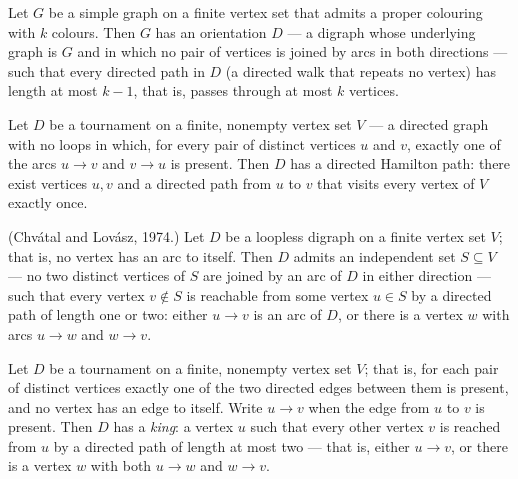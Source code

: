 \begin{theorem}
\label{exists_orientation_longest_directedPath_le}
\leanok
{}
Let $G$ be a simple graph on a finite vertex set that admits a proper colouring with $k$
colours. Then $G$ has an orientation $D$ — a digraph whose underlying graph is $G$ and
in which no pair of vertices is joined by arcs in both directions — such that every
directed path in $D$ (a directed walk that repeats no vertex) has length at most $k-1$,
that is, passes through at most $k$ vertices.
\end{theorem}

\begin{theorem}
\label{redei_directed_hamilton_path}
\leanok
{}
Let $D$ be a tournament on a finite, nonempty vertex set $V$ — a directed graph with no
loops in which, for every pair of distinct vertices $u$ and $v$, exactly one of the arcs
$u \to v$ and $v \to u$ is present. Then $D$ has a directed Hamilton path: there exist
vertices $u, v$ and a directed path from $u$ to $v$ that visits every vertex of $V$
exactly once.
\end{theorem}

\begin{theorem}
\label{chvatal_lovasz_semikernel}
\leanok
(Chvátal and Lovász, 1974.) Let $D$ be a loopless digraph on a finite vertex set $V$;
that is, no vertex has an arc to itself. Then $D$ admits an independent set $S \subseteq
V$ — no two distinct vertices of $S$ are joined by an arc of $D$ in either direction —
such that every vertex $v \notin S$ is reachable from some vertex $u \in S$ by a
directed path of length one or two: either $u \to v$ is an arc of $D$, or there is a
vertex $w$ with arcs $u \to w$ and $w \to v$.
\end{theorem}

\begin{theorem}
\label{tournament_exists_king}
\leanok
{}
Let $D$ be a tournament on a finite, nonempty vertex set $V$; that is, for each pair of
distinct vertices exactly one of the two directed edges between them is present, and no
vertex has an edge to itself. Write $u \to v$ when the edge from $u$ to $v$ is present.
Then $D$ has a \emph{king}: a vertex $u$ such that every other vertex $v$ is reached
from $u$ by a directed path of length at most two — that is, either $u \to v$, or there
is a vertex $w$ with both $u \to w$ and $w \to v$.
\end{theorem}

